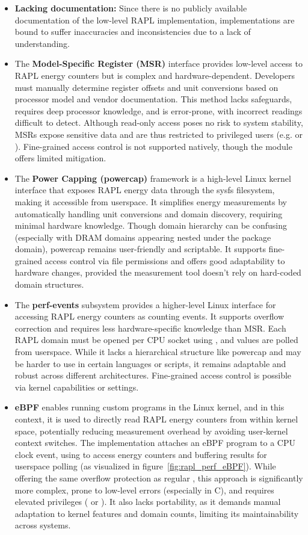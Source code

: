 \begin{itemize}
    \item \textbf{Lacking documentation:} Since there is no publicly available documentation of the low-level RAPL implementation, implementations are bound to suffer inaccuracies and inconsistencies due to a lack of understanding.
    \item The \textbf{Model-Specific Register (MSR)} interface provides low-level access to RAPL energy counters but is complex and hardware-dependent. Developers must manually determine register offsets and unit conversions based on processor model and vendor documentation. This method lacks safeguards, requires deep processor knowledge, and is error-prone, with incorrect readings difficult to detect. Although read-only access poses no risk to system stability, MSRs expose sensitive data and are thus restricted to privileged users (e.g.  or ). Fine-grained access control is not supported natively, though the  module offers limited mitigation.
    \item The \textbf{Power Capping (powercap)} framework is a high-level Linux kernel interface that exposes RAPL energy data through the sysfs filesystem, making it accessible from userspace. It simplifies energy measurements by automatically handling unit conversions and domain discovery, requiring minimal hardware knowledge. Though domain hierarchy can be confusing (especially with DRAM domains appearing nested under the package domain), powercap remains user-friendly and scriptable. It supports fine-grained access control via file permissions and offers good adaptability to hardware changes, provided the measurement tool doesn't rely on hard-coded domain structures.
    \item The \textbf{perf-events} subsystem provides a higher-level Linux interface for accessing RAPL energy counters as counting events. It supports overflow correction and requires less hardware-specific knowledge than MSR. Each RAPL domain must be opened per CPU socket using , and values are polled from userspace. While it lacks a hierarchical structure like powercap and may be harder to use in certain languages or scripts, it remains adaptable and robust across different architectures. Fine-grained access control is possible via kernel capabilities or  settings. 
    \item \textbf{eBPF} enables running custom programs in the Linux kernel, and in this context, it is used to directly read RAPL energy counters from within kernel space, potentially reducing measurement overhead by avoiding user-kernel context switches. The implementation attaches an eBPF program to a CPU clock event, using  to access energy counters and buffering results for userspace polling (as visualized in figure~\ref{fig:rapl_perf_eBPF}). While offering the same overflow protection as regular , this approach is significantly more complex, prone to low-level errors (especially in C), and requires elevated privileges ( or ). It also lacks portability, as it demands manual adaptation to kernel features and domain counts, limiting its maintainability across systems.
\end{itemize}

